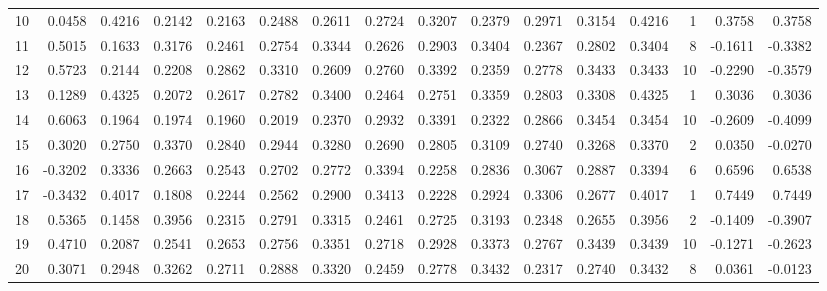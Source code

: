 \begin{tabular}{lrrrrrrrrrrrrrrr}
10  &      0.0458 &  0.4216 &  0.2142 &  0.2163 &  0.2488 &  0.2611 &  0.2724 &  0.3207 &  0.2379 &  0.2971 &   0.3154 &     0.4216 &      1 &                    0.3758 &                     0.3758 \\
11  &      0.5015 &  0.1633 &  0.3176 &  0.2461 &  0.2754 &  0.3344 &  0.2626 &  0.2903 &  0.3404 &  0.2367 &   0.2802 &     0.3404 &      8 &                   -0.1611 &                    -0.3382 \\
12  &      0.5723 &  0.2144 &  0.2208 &  0.2862 &  0.3310 &  0.2609 &  0.2760 &  0.3392 &  0.2359 &  0.2778 &   0.3433 &     0.3433 &     10 &                   -0.2290 &                    -0.3579 \\
13  &      0.1289 &  0.4325 &  0.2072 &  0.2617 &  0.2782 &  0.3400 &  0.2464 &  0.2751 &  0.3359 &  0.2803 &   0.3308 &     0.4325 &      1 &                    0.3036 &                     0.3036 \\
14  &      0.6063 &  0.1964 &  0.1974 &  0.1960 &  0.2019 &  0.2370 &  0.2932 &  0.3391 &  0.2322 &  0.2866 &   0.3454 &     0.3454 &     10 &                   -0.2609 &                    -0.4099 \\
15  &      0.3020 &  0.2750 &  0.3370 &  0.2840 &  0.2944 &  0.3280 &  0.2690 &  0.2805 &  0.3109 &  0.2740 &   0.3268 &     0.3370 &      2 &                    0.0350 &                    -0.0270 \\
16  &     -0.3202 &  0.3336 &  0.2663 &  0.2543 &  0.2702 &  0.2772 &  0.3394 &  0.2258 &  0.2836 &  0.3067 &   0.2887 &     0.3394 &      6 &                    0.6596 &                     0.6538 \\
17  &     -0.3432 &  0.4017 &  0.1808 &  0.2244 &  0.2562 &  0.2900 &  0.3413 &  0.2228 &  0.2924 &  0.3306 &   0.2677 &     0.4017 &      1 &                    0.7449 &                     0.7449 \\
18  &      0.5365 &  0.1458 &  0.3956 &  0.2315 &  0.2791 &  0.3315 &  0.2461 &  0.2725 &  0.3193 &  0.2348 &   0.2655 &     0.3956 &      2 &                   -0.1409 &                    -0.3907 \\
19  &      0.4710 &  0.2087 &  0.2541 &  0.2653 &  0.2756 &  0.3351 &  0.2718 &  0.2928 &  0.3373 &  0.2767 &   0.3439 &     0.3439 &     10 &                   -0.1271 &                    -0.2623 \\
20  &      0.3071 &  0.2948 &  0.3262 &  0.2711 &  0.2888 &  0.3320 &  0.2459 &  0.2778 &  0.3432 &  0.2317 &   0.2740 &     0.3432 &      8 &                    0.0361 &                    -0.0123 \\

\end{tabular}
